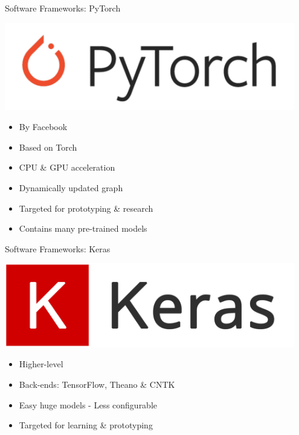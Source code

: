 \begin{frame}{Software Frameworks: PyTorch}
	\begin{minipage}{0.4\textwidth}
		\centering
		\includegraphics[width=0.95\textwidth]{../Images/CNNArchitectures/pytorch-logo.png}\\
	\end{minipage}%
	\begin{minipage}{0.6\textwidth}
		\begin{itemize}
			\item By Facebook
			\item Based on Torch
			\item CPU \& GPU acceleration
			\item Dynamically updated graph
			\item Targeted for prototyping \& research
			\item Contains many pre-trained models
		\end{itemize}
	\end{minipage}
\end{frame}

\begin{frame}{Software Frameworks: Keras}
	\begin{minipage}{0.4\textwidth}
		\centering
		\includegraphics[width=0.95\textwidth]{../Images/CNNArchitectures/keras-logo.png}\\
	\end{minipage}%
	\begin{minipage}{0.6\textwidth}
		\begin{itemize}
			\item Higher-level
			\item Back-ends: TensorFlow, Theano \& CNTK
			\item Easy huge models - Less configurable
			\item Targeted for learning \& prototyping
		\end{itemize}
	\end{minipage}
\end{frame}

